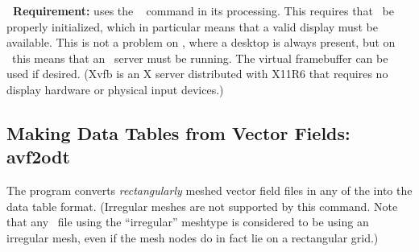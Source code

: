 \textbf{\Tk\ Requirement:}  uses the
\Tk\  command in its processing.  This requires that \Tk\ be
properly initialized, which in particular means that a valid display
must be available.  This is not a problem on \Windows, where a desktop
is always present, but on \Unix\ this means that an \X\ server must be
running.  The
virtual framebuffer can be used if desired.  (Xvfb is an X server
distributed with X11R6 that requires no display hardware or physical
input devices.)


\subsection{Making Data Tables from Vector Fields:
          avf2odt}\label{sec:avf2odt}%
%
The  program converts \textit{rectangularly} meshed vector field
files in any of the  into the  data table format.  (Irregular meshes are
not supported by this command.  Note that any \OVF\ file using the
``irregular'' meshtype is considered to be using an irregular mesh, even
if the mesh nodes do in fact lie on a rectangular grid.)

